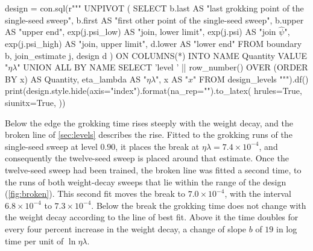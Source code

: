 \documentclass[a4paper,11pt]{article} %
\begin{document}
\begin{table}[H]
  \centering
  \caption{The sequential design
    \citep[Sec.~5.4]{bergerIntroductionOptimalDesigns2009}. The single-seed sweep's last
    grokking point, its first other point and their geometric midpoint, the
    upper end of the range
    \citep[App.~G.2.1]{pracherSpectralTheoryGrokking2026};
    the join $\hat\psi$ of the broken line fitted to the single-seed sweep's runs, with its
    interval \citep{muggeoSegmentedPackageFit2008}; the lower end of the single-seed sweep;
    and the four levels of \citet[Sec.~4.1]{parkExperimentalDesignsFitting1978a}
  at $x$, $\ln\eta\lambda$ rescaled to $[-1,1]$.}
  \label{tab:design}
\begin{pycode}
design = con.sql(r"""
    UNPIVOT (
        SELECT b.last AS "last grokking point of the single-seed sweep",
            b.first AS "first other point of the single-seed sweep",
            b.upper AS "upper end",
            exp(j.psi_low) AS "join, lower limit",
            exp(j.psi) AS "join $\hat\psi$",
            exp(j.psi_high) AS "join, upper limit",
            d.lower AS "lower end"
        FROM boundary b, join_estimate j, design d
    ) ON COLUMNS(*) INTO NAME Quantity VALUE "$\eta\lambda$"
    UNION ALL BY NAME
    SELECT 'level ' || row_number() OVER (ORDER BY x) AS Quantity,
        eta_lambda AS "$\eta\lambda$", x AS "$x$"
    FROM design_levels
""").df()
print(design.style.hide(axis="index").format(na_rep="").to_latex(
    hrules=True, siunitx=True,
))
\end{pycode}
\end{table}

Below the edge the grokking time rises steeply with the weight decay, and the broken line of
\cref{sec:levels} describes the rise. Fitted to the grokking runs of the single-seed sweep at
level $0.90$, it places the break at $\eta\lambda=7.4\times10^{-4}$, and consequently the twelve-seed
sweep is placed around that estimate. Once the twelve-seed sweep had been trained, the broken line was fitted a second time,
to the runs of both weight-decay sweeps that lie within the range of the design
(\cref{fig:broken}). This second fit moves the break to $7.0\times10^{-4}$, with the
interval $6.8\times10^{-4}$ to $7.3\times10^{-4}$. Below the break the grokking
time does not change with the weight decay according to the line of best fit. Above it the time doubles for every four percent
increase in the weight decay, a change of slope $b$ of $19$ in log time per unit of
$\ln\eta\lambda$.
\end{document}
